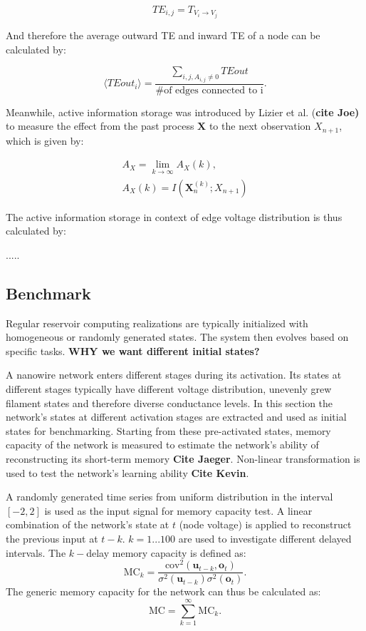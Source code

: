 \documentclass[%
 reprint,
 amsmath,amssymb,
 aps,
floatfix,
]{revtex4-2}
\begin{document}
\begin{equation}
TE_{i,j} = T_{V_i \rightarrow V_j}
\end{equation}

And therefore the average outward TE and inward TE of a node can be calculated by:

\begin{equation}
\langle TEout_i \rangle = \frac{\sum \limits_{i,j, A_{i,j} \neq 0} TEout}{\text{\# of edges connected to i}}.
\end{equation}


Meanwhile, active information storage was introduced by Lizier et al. (\textbf{cite Joe)} to measure the effect from the past process $\mathbf X$ to the next observation $X_{n+1}$, which is given by:

\begin{align}
	A_X = \lim \limits_{k \rightarrow \infty} A_X (k),\\
	A_X(k) = I(\mathbf X_n^{(k)}; X_{n+1})
	\label{eq:AIS}
\end{align}

The active information storage in context of edge voltage distribution is thus calculated by:

.....

\subsection{Benchmark}

Regular reservoir computing realizations are typically initialized with homogeneous or randomly generated states. The system then evolves based on specific tasks. \textbf{WHY we want different initial states?}


A nanowire network enters different stages during its activation. Its states at different stages typically have different voltage distribution, unevenly grew filament states and therefore diverse conductance levels. 
In this section the network's states at different activation stages are extracted and used as initial states for benchmarking. Starting from these pre-activated states, memory capacity of the network is measured to estimate the network's ability of reconstructing its short-term memory \textbf{Cite Jaeger}. Non-linear transformation is used to test the network's learning ability \textbf{Cite Kevin}.

A randomly generated time series from uniform distribution in the interval $[-2,2]$ is used as the input signal for memory capacity test. A linear combination of the network's state at $t$ (node voltage) is applied to reconstruct the previous input at $t - k$. $k = 1 ... 100$ are used to investigate different delayed intervals. The $k-$delay memory capacity is defined as:
\begin{equation}
	\text{MC}_k = \dfrac{\text{cov}^2(\mathbf u_{t-k}, \mathbf o_t)}{\sigma^2 (\mathbf u_{t-k}) \sigma^2 (\mathbf o_t)}.
\end{equation}
The generic memory capacity for the network can thus be calculated as:
\begin{equation}
	\text{MC} = \sum \limits_{k=1}^\infty \text{MC}_k.
\end{equation}
\end{document}
